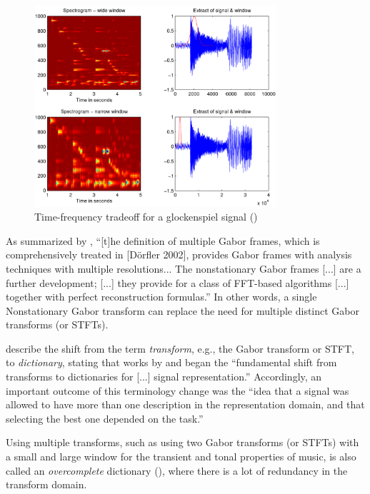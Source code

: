 \documentclass[report.tex]{subfiles}
\begin{document}
\begin{figure}[ht]
	\centering
	\includegraphics[width=0.8\textwidth]{./images-tftheory/tf_tradeoff_dorfler.png}
	\caption{Time-frequency tradeoff for a glockenspiel signal (\cite{doerflerphd})}
	\label{fig:dorflertradeoff}
\end{figure}

As summarized by \textcite{adaptivecqt}, ``[t]he definition of multiple Gabor frames, which is comprehensively treated in [D{\"o}rfler 2002], provides Gabor frames with analysis techniques with multiple resolutions... The nonstationary Gabor frames [...] are a further development; [...] they provide for a class of FFT-based algorithms [...] together with perfect reconstruction formulas.'' In other words, a single Nonstationary Gabor transform can replace the need for multiple distinct Gabor transforms (or STFTs).

\textcite{dictionary} describe the shift from the term \textit{transform}, e.g., the Gabor transform or STFT, to \textit{dictionary}, stating that works by \cite{dictionary1} and \cite{dictionary2} began the ``fundamental shift from transforms to dictionaries for [...] signal representation.'' Accordingly, an important outcome of this terminology change was the ``idea that a signal was allowed to have more than one description in the representation domain, and that selecting the best one depended on the task.''

Using multiple transforms, such as using two Gabor transforms (or STFTs) with a small and large window for the transient and tonal properties of music, is also called an \textit{overcomplete} dictionary (\cite{dictionary}), where there is a lot of redundancy in the transform domain.
\end{document}
